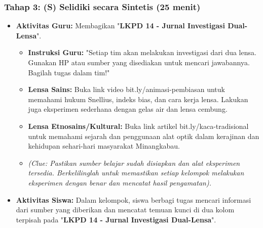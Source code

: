 \documentclass[12pt,a4paper]{article}
\begin{document}
\subsubsection{Tahap 3: (S) Selidiki secara Sintetis (25 menit)}
\begin{itemize}
\item \textbf{Aktivitas Guru:} Membagikan "\textbf{LKPD 14 - Jurnal Investigasi Dual-Lensa}".
    \begin{itemize}
    \item \textbf{Instruksi Guru:} "Setiap tim akan melakukan investigasi dari dua lensa. Gunakan HP atau sumber yang disediakan untuk mencari jawabannya. Bagilah tugas dalam tim!"
    \item \textbf{Lensa Sains:} Buka link video bit.ly/animasi-pembiasan untuk memahami hukum Snellius, indeks bias, dan cara kerja lensa. Lakukan juga eksperimen sederhana dengan gelas air dan lensa cembung.
    \item \textbf{Lensa Etnosains/Kultural:} Buka link artikel bit.ly/kaca-tradisional untuk memahami sejarah dan penggunaan alat optik dalam kerajinan dan kehidupan sehari-hari masyarakat Minangkabau.
    \item \textit{(Clue: Pastikan sumber belajar sudah disiapkan dan alat eksperimen tersedia. Berkelilinglah untuk memastikan setiap kelompok melakukan eksperimen dengan benar dan mencatat hasil pengamatan).}
    \end{itemize}
\item \textbf{Aktivitas Siswa:} Dalam kelompok, siswa berbagi tugas mencari informasi dari sumber yang diberikan dan mencatat temuan kunci di dua kolom terpisah pada "\textbf{LKPD 14 - Jurnal Investigasi Dual-Lensa}".
\end{itemize}
\end{document}
